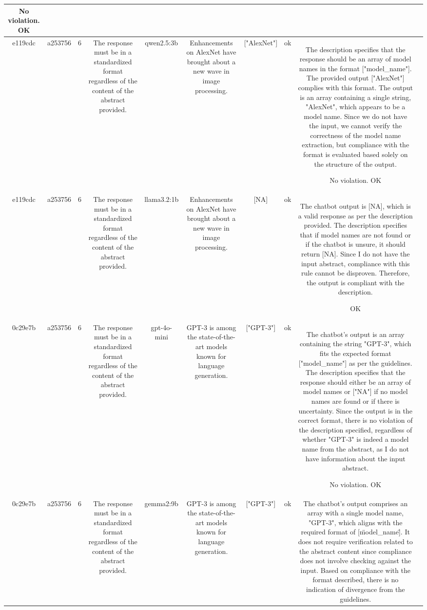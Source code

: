 \begin{table}[h!]
\begin{tabular}{|c|c|c|c|c|c|c|c|c|c|}
No violation.
OK & \\
\hline
e119cdc & a253756 & 6 & The response must be in a standardized format regardless of the content of the abstract provided. & qwen2.5:3b & Enhancements on AlexNet have brought about a new wave in image processing. & ["AlexNet"] & ok & The description specifies that the response should be an array of model names in the format ["model_name"]. The provided output ["AlexNet"] complies with this format. The output is an array containing a single string, "AlexNet", which appears to be a model name. Since we do not have the input, we cannot verify the correctness of the model name extraction, but compliance with the format is evaluated based solely on the structure of the output.

No violation.
OK & \\
\hline
e119cdc & a253756 & 6 & The response must be in a standardized format regardless of the content of the abstract provided. & llama3.2:1b & Enhancements on AlexNet have brought about a new wave in image processing. & [NA] & ok & The chatbot output is [NA], which is a valid response as per the description provided. The description specifies that if model names are not found or if the chatbot is unsure, it should return [NA]. Since I do not have the input abstract, compliance with this rule cannot be disproven. Therefore, the output is compliant with the description.

OK & \\
\hline
0c29e7b & a253756 & 6 & The response must be in a standardized format regardless of the content of the abstract provided. & gpt-4o-mini & GPT-3 is among the state-of-the-art models known for language generation. & ["GPT-3"] & ok & The chatbot's output is an array containing the string "GPT-3", which fits the expected format ["model_name"] as per the guidelines. The description specifies that the response should either be an array of model names or ["NA"] if no model names are found or if there is uncertainty. Since the output is in the correct format, there is no violation of the description specified, regardless of whether "GPT-3" is indeed a model name from the abstract, as I do not have information about the input abstract.

No violation.
OK & \\
\hline
0c29e7b & a253756 & 6 & The response must be in a standardized format regardless of the content of the abstract provided. & gemma2:9b & GPT-3 is among the state-of-the-art models known for language generation. & ["GPT-3"] 
 & ok & The chatbot's output comprises an array with a single model name, "GPT-3", which aligns with the required format of [\"model_name\"]. It does not require verification related to the abstract content since compliance does not involve checking against the input. Based on compliance with the format described, there is no indication of divergence from the guidelines. 


\end{tabular}
\end{table}
